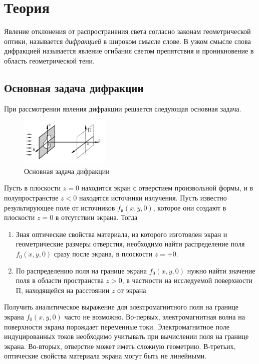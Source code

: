 \section*{Теория}

Явление отклонения от распространения света согласно законам геометрической оптики, называется \textit{дифракцией} в широком смысле слове. В узком смысле слова дифракцией называется явление огибания светом препятствия и проникновение в область геометрической тени.

\subsection*{Основная задача дифракции}

При рассмотрении явления дифракции решается следующая основная задача.

\begin{figure}
	\centering
	\includegraphics[width=0.38\textwidth]{../Изображения/Задача дифракции.png}
	\caption{Основная задача дифракции}
\end{figure}

Пусть в плоскости $z = 0$ находится экран с отверстием произвольной формы, и в полупространстве $z < 0$ находятся источники излучения. Пусть известно результирующее поле от источников $f_и(x, y, 0)$, которое они создают в плоскости $z = 0$ в отсутствии экрана. Тогда
\begin{enumerate}
	\item Зная оптические свойства материала, из которого изготовлен экран и геометрические размеры отверстия, необходимо найти распределение поля $f_0(x, y, 0)$ сразу после экрана, в плоскости $z = +0$.
		
	\item По распределению поля на границе экрана $f_0(x, y, 0)$ нужно найти значение поля в области пространства $z > 0$, в частности на исследуемой поверхности $П$, находящейся на расстоянии $z$ от экрана.
\end{enumerate}

\newpage

Получить аналитическое выражение для электромагнитного поля на границе экрана $f_0(x, y, 0)$ часто не возможно. Во-первых, электромагнитная волна на поверхности экрана порождает переменные токи. Электромагнитное поле индуцированных токов необходимо учитывать при вычислении поля на границе экрана. Во-вторых, отверстие может иметь сложную геометрию. В-третьих, оптические свойства материала экрана могут быть не линейными.

